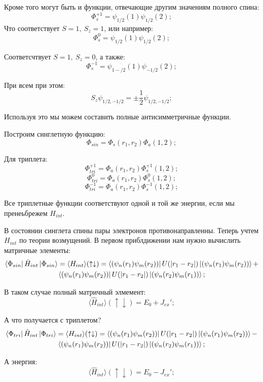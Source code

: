 \documentclass[a4paper, 14pt, russian]{article}
\newcommand{\be}{\begin{equation}}
\newcommand{\ee}{\end{equation}}
\begin{document}
	Кроме того могут быть и функции, отвечающие другим значениям полного спина:
	\be
		\Phi^{+1}_s = \psi_{1/2}(1) \psi_{1/2}(2);
	\ee
	Что соответствует $S = 1,~S_z = 1$, или например:
	\be
		\Phi^{0}_s = \psi_{1/2}(1) \psi_{1/2}(2);
	\ee

	Соответсчтвует $S = 1,~S_z = 0$, а также:
	\be
		\Phi^{-1}_s = \psi_{1-/2}(1) \psi_{-1/2}(2);
	\ee

	При всем при этом:
	\be
		S_z \psi_{1/2,-1/2} = \pm \frac{1}{2} \psi_{1/2,-1/2};
	\ee

	Используя это мы можем составить полные антисимметричные функции.

	Построим синглетную функцию:
	\be
		\Phi_{sin} = \Phi_s(r_1,r_2) \Phi_a(1,2);
	\ee

	Для триплета:
	\be
		\Phi^{+1}_{tri} = \Phi_a(r_1,r_2) \Phi^{+1}_s(1,2);
	\ee
	\be
		\Phi^{0}_{tri} = \Phi_a(r_1,r_2) \Phi^{0}_s(1,2);
	\ee
	\be
		\Phi^{-1}_{tri} = \Phi_a(r_1,r_2) \Phi^{-1}_s(1,2);
	\ee

	Все триплетные функции соответствуют одной и той же энергии, если мы пренеьбрежем
	$H_{int}$.

	В состоянии синглета спины пары электронов противонаправленны. Теперь учтем $H_{int}$
	по теории возмущений. В первом приблдижении нам нужно 
	вычислить матричные элементы:
	\begin{multline}
		\bra{\Phi_{sin}} \hat{H}_{int} \ket{\Phi_{sin}} = \langle H_{int} \rangle (\uparrow \downarrow) = 
		\bra{(\psi_n(r_1) \psi_m(r_2))} U(\abs{r_1 - r_2}) \ket{(\psi_n(r_1) \psi_m(r_2))} + \\
		\bra{(\psi_n(r_1) \psi_m(r_2))} U(\abs{r_1 - r_2}) \ket{(\psi_n(r_2) \psi_m(r_1))};
	\end{multline}

	В таком случае полный матричный элмемент:
	\be
		\langle \hat{H}_{int} \rangle (\uparrow \downarrow) = E_0 + J_{ex} ';
	\ee

	А что получается с триплетом?
	\begin{multline}
		\bra{\Phi_{tri}} \hat{H}_{int} \ket{\Phi_{tri}} = \langle H_{int} \rangle (\uparrow \downarrow) = 
		\bra{(\psi_n(r_1) \psi_m(r_2))} U(\abs{r_1 - r_2}) \ket{(\psi_n(r_1) \psi_m(r_2))} - \\
		\bra{(\psi_n(r_1) \psi_m(r_2))} U(\abs{r_1 - r_2}) \ket{(\psi_n(r_2) \psi_m(r_1))};
	\end{multline}

	А энергия:
	\be
		\langle \hat{H}_{int} \rangle (\uparrow \downarrow) = E_0 - J_{ex} ';
	\ee
\end{document}
